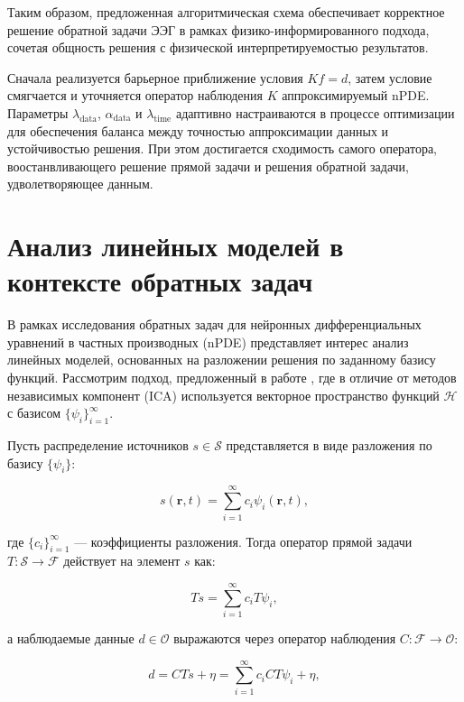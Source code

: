 \documentclass[sn-mathphys-num]{bst/sn-jnl}
\theoremstyle{thmstylethree}
\theoremstyle{thmstyletwo}
\theoremstyle{thmstyleone}
\begin{document}
Таким образом, предложенная алгоритмическая схема обеспечивает корректное решение обратной задачи ЭЭГ в рамках физико-информированного подхода, 
сочетая общность решения с физической интерпретируемостью результатов.

Сначала реализуется барьерное приближение условия $Kf=d$, затем условие смягчается и уточняется оператор наблюдения $K$ аппроксимируемый nPDE. Параметры $\lambda_{\mathrm{data}}$, 
$\alpha_{\mathrm{data}}$ и $\lambda_{\mathrm{time}}$ адаптивно 
настраиваются в процессе оптимизации для обеспечения баланса между точностью аппроксимации данных и устойчивостью решения. При этом достигается сходимость самого оператора, воостанвливающего
решение прямой задачи и решения обратной задачи, удволетворяющее данным.

\section{Анализ линейных моделей в контексте обратных задач}

В рамках исследования обратных задач для нейронных дифференциальных уравнений в частных производных (nPDE) представляет интерес анализ линейных моделей, основанных на разложении решения по заданному базису функций. Рассмотрим подход, предложенный в работе \cite{Palummo2024}, где в отличие от методов независимых компонент (ICA) используется векторное пространство функций $\mathcal{H}$ с базисом $\{\psi_i\}_{i=1}^\infty$.

Пусть распределение источников $s \in \mathcal{S}$ представляется в виде разложения по базису $\{\psi_i\}$:

\begin{equation}
    s(\mathbf{r}, t) = \sum_{i=1}^\infty c_i \psi_i(\mathbf{r}, t),
\end{equation}

где $\{c_i\}_{i=1}^\infty$ --- коэффициенты разложения. Тогда оператор прямой задачи $T: \mathcal{S} \to \mathcal{F}$ действует на элемент $s$ как:

\begin{equation}
    Ts = \sum_{i=1}^\infty c_i T\psi_i,
\end{equation}

а наблюдаемые данные $d \in \mathcal{O}$ выражаются через оператор наблюдения $C: \mathcal{F} \to \mathcal{O}$:

\begin{equation}
    d = C Ts + \eta = \sum_{i=1}^\infty c_i C T \psi_i + \eta,
\end{equation}
\end{document}
